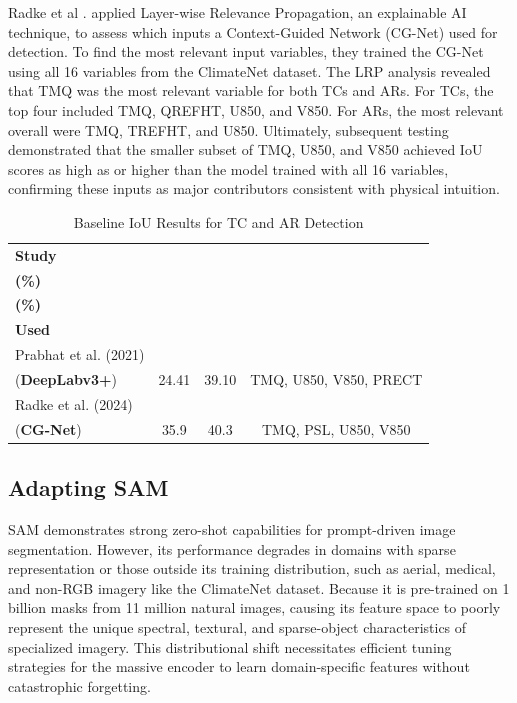 Radke et al \cite{radke2024explaining}. applied Layer-wise Relevance Propagation, an explainable AI technique, to assess which inputs a Context-Guided Network (CG-Net) used for detection. To find the most relevant input variables, they trained the CG-Net using all 16 variables from the ClimateNet dataset. The LRP analysis revealed that TMQ was the most relevant variable for both TCs and ARs. For TCs, the top four included TMQ, QREFHT, U850, and V850. For ARs, the most relevant overall were TMQ, TREFHT, and U850. Ultimately, subsequent testing demonstrated that the smaller subset of TMQ, U850, and V850 achieved IoU scores as high as or higher than the model trained with all 16 variables, confirming these inputs as major contributors consistent with physical intuition.

\begin{table}[h!]
\centering
\caption{Baseline IoU Results for TC and AR Detection}
\label{tab:baseline_iou}
\begin{tabular}{lccc} %
\toprule
\textbf{Study} & \thead{\textbf{TC IoU} \\ \textbf{(\%)}} & \thead{\textbf{AR IoU} \\ \textbf{(\%)}} & \thead{\textbf{Key Variables} \\ \textbf{Used}} \\
\midrule
Prabhat et al. (2021) \\ (\textbf{DeepLabv3+}) & 24.41 & 39.10 & TMQ, U850, V850, PRECT \\
Radke et al. (2024) \\ (\textbf{CG-Net}) & 35.9 & 40.3 & TMQ, PSL, U850, V850 \\
\bottomrule
\end{tabular}
\end{table}


\subsection{Adapting SAM}
SAM \cite{kirillov2023segment} demonstrates strong zero-shot capabilities for prompt-driven image segmentation. However, its performance degrades in domains with sparse representation or those outside its training distribution, such as aerial, medical, and non-RGB imagery \cite{chen2023sam, ji2024segment} like the ClimateNet dataset. Because it is pre-trained on 1 billion masks from 11 million natural images, causing its feature space to poorly represent the unique spectral, textural, and sparse-object characteristics of specialized imagery. This distributional shift necessitates efficient tuning strategies for the massive encoder to learn domain-specific features without catastrophic forgetting.

